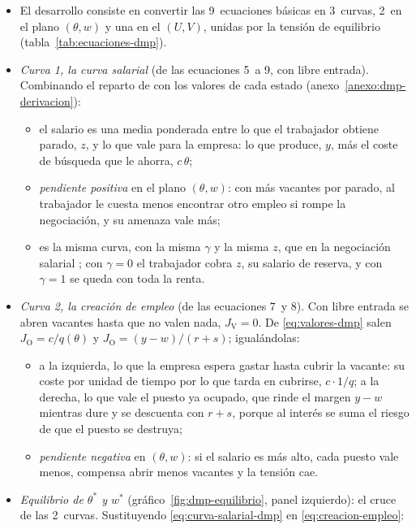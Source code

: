 \documentclass[11pt]{article}
\begin{document}
\begin{itemize}
\item El desarrollo consiste en convertir las 9~ecuaciones básicas en 3~curvas, 2~en el plano $(\theta,w)$ y una en el $(U,V)$, unidas por la tensión de equilibrio (tabla~\ref{tab:ecuaciones-dmp}).
\item \emph{Curva 1, la curva salarial} (de las ecuaciones 5~a 9, con libre entrada). Combinando el reparto de  con los valores de cada estado (anexo~\ref{anexo:dmp-derivacion}):
  \begin{itemize}
  \item el salario es una media ponderada entre lo que el trabajador obtiene parado, $z$, y lo que vale para la empresa: lo que produce, $y$, más el coste de búsqueda que le ahorra, $c\,\theta$;
  \item \emph{pendiente positiva} en el plano $(\theta,w)$: con más vacantes por parado, al trabajador le cuesta menos encontrar otro empleo si rompe la negociación, y su amenaza vale más;
  \item es la misma curva, con la misma $\gamma$ y la misma $z$, que en la negociación salarial ; con $\gamma=0$ el trabajador cobra $z$, su salario de reserva, y con $\gamma=1$ se queda con toda la renta.
  \end{itemize}
\item \emph{Curva 2, la creación de empleo} (de las ecuaciones 7~y 8). Con libre entrada se abren vacantes hasta que no valen nada, $J_{\mathrm V}=0$. De \eqref{eq:valores-dmp} salen $J_{\mathrm O}=c/q(\theta)$ y $J_{\mathrm O}=(y-w)/(r+s)$; igualándolas:
  \begin{itemize}
  \item a la izquierda, lo que la empresa espera gastar hasta cubrir la vacante: su coste por unidad de tiempo por lo que tarda en cubrirse, $c\cdot 1/q$; a la derecha, lo que vale el puesto ya ocupado, que rinde el margen $y-w$ mientras dure y se descuenta con $r+s$, porque al interés se suma el riesgo de que el puesto se destruya;
  \item \emph{pendiente negativa} en $(\theta,w)$: si el salario es más alto, cada puesto vale menos, compensa abrir menos vacantes y la tensión cae.
  \end{itemize}
\item \emph{Equilibrio de $\theta^*$ y $w^*$} (gráfico~\ref{fig:dmp-equilibrio}, panel izquierdo): el cruce de las 2~curvas. Sustituyendo \eqref{eq:curva-salarial-dmp} en \eqref{eq:creacion-empleo}:

\end{itemize}
\end{document}
